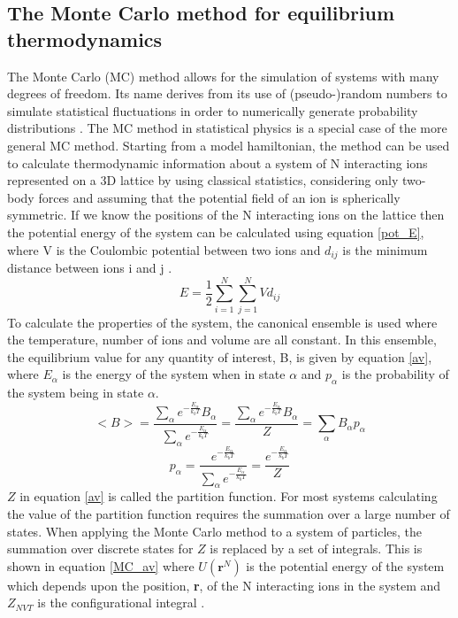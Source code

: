 \documentclass[11pt, twoside]{report}
\begin{document}
\subsection{The Monte Carlo method for equilibrium thermodynamics}
The Monte Carlo (MC) method allows for the simulation of systems with many degrees of freedom. Its name derives from its use of (pseudo-)random numbers to simulate statistical fluctuations in order to numerically generate probability distributions \cite{MC3}.
The MC method in statistical physics is a special case of the more general MC method.
Starting from a model hamiltonian, the method can be used to calculate thermodynamic information about a system of N interacting ions represented on a 3D lattice by using classical statistics, considering only two-body forces and assuming that the potential field of an ion is spherically symmetric. If we know the positions of the N interacting ions on the lattice then the potential energy of the system can be calculated using equation \ref{pot_E}, where V is the Coulombic potential between two ions and $d_{ij}$ is the minimum distance between ions i and j \cite{Metropolis}.
\begin{equation}\label{pot_E}
E = \frac{1}{2} \sum_{i=1}^N \sum_{j=1}^N V d_{ij}
\end{equation}
To calculate the properties of the system, the canonical ensemble is used where the temperature, number of ions and volume are all constant. In this ensemble, the equilibrium value for any quantity of interest, B, is given by equation \ref{av}, where $E_\alpha$ is the energy of the system when in state $\alpha$ and $p_\alpha$ is the probability of the system being in state $\alpha$.
\begin{equation}\label{av}
<B> = \frac{ \sum_\alpha e^{-\frac{E_\alpha}{k_bT}} B_\alpha}{ \sum_\alpha e^{-\frac{E_\alpha}{k_bT}}} = \frac{ \sum_\alpha e^{-\frac{E_\alpha}{k_bT}} B_\alpha}{Z} = \sum_\alpha B_\alpha p_\alpha
\end{equation}
\begin{equation}\label{prob}
p_\alpha = \frac{  e^{-\frac{E_\alpha}{k_bT}} }{ \sum_{\alpha} e^{-\frac{E_\alpha}{k_bT}}} =\frac{  e^{-\frac{E_\alpha}{k_bT}} }{Z}
\end{equation}
$Z$ in equation \ref{av} is called the partition function. For most systems calculating the value of the partition function requires the summation over a large number of states. When applying the Monte Carlo method to a system of particles, the summation over discrete states for $Z$ is replaced by a set of integrals. This is shown in equation \ref{MC_av} where $U(\mathbf{r}^N)$ is the potential energy of the system which depends upon the position, \textbf{r}, of the N interacting ions in the system and $Z_{NVT}$ is the configurational integral \cite{Lesar3}.
\end{document}
